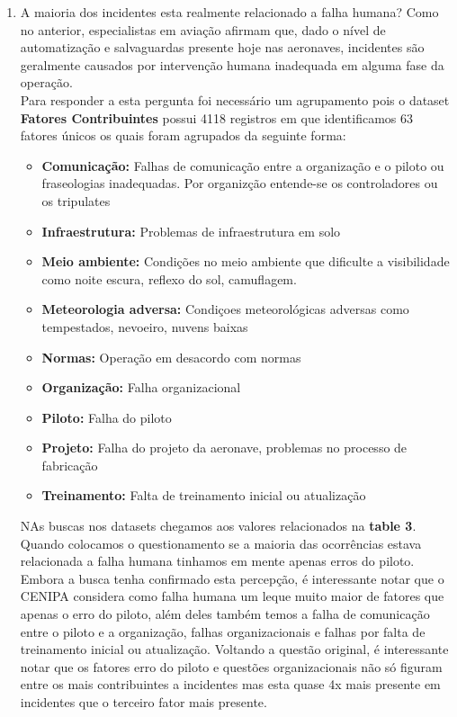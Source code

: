 \documentclass[conference]{IEEEtran}
\begin{document}
\begin{enumerate}
 \item A maioria dos incidentes esta realmente relacionado a falha humana? Como no anterior, especialistas em aviação afirmam que, dado o nível de automatização e salvaguardas 
 presente hoje nas aeronaves, incidentes são geralmente causados por intervenção humana inadequada em alguma fase da operação.\\
 
 Para responder a esta pergunta foi necessário um agrupamento pois o dataset \textbf{Fatores Contribuintes} possui 4118 registros em que identificamos 63 fatores únicos os quais
 foram agrupados da seguinte forma:
 
 \begin{itemize}
  \item \textbf{Comunicação:} Falhas de comunicação entre a organização e o piloto ou fraseologias inadequadas. Por organizção entende-se os controladores ou os tripulates
  \item \textbf{Infraestrutura:} Problemas de infraestrutura em solo
  \item \textbf{Meio ambiente:} Condições no meio ambiente que dificulte a visibilidade como noite escura, reflexo do sol, camuflagem.
  \item \textbf{Meteorologia adversa:} Condiçoes meteorológicas adversas como tempestados, nevoeiro, nuvens baixas
  \item \textbf{Normas:} Operação em desacordo com normas
  \item \textbf{Organização:} Falha organizacional
  \item \textbf{Piloto:} Falha do piloto
  \item \textbf{Projeto:} Falha do projeto da aeronave, problemas no processo de fabricação
  \item \textbf{Treinamento:} Falta de treinamento inicial ou atualização
 \end{itemize}
 
 NAs buscas nos datasets chegamos aos valores relacionados na \textbf{table 3}. Quando colocamos o questionamento se a maioria das ocorrências estava relacionada a falha
 humana tinhamos em mente apenas erros do piloto. Embora a busca tenha confirmado esta percepção, é interessante notar que o CENIPA considera como falha humana um leque 
 muito maior de fatores que apenas o erro do piloto, além deles também temos a falha de comunicação entre o piloto e a organização, falhas organizacionais e falhas por 
 falta de treinamento inicial ou atualização. Voltando a questão original, é interessante notar que os fatores erro do piloto e questões organizacionais não só figuram 
 entre os mais contribuintes a incidentes mas esta quase 4x mais presente em incidentes que o  terceiro fator mais presente.\\
 
\end{enumerate}
\end{document}
